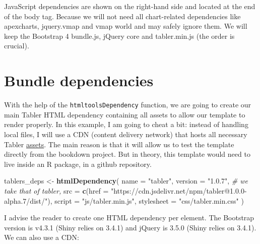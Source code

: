 \documentclass[
]{book}
\newenvironment{Shaded}{\begin{snugshade}}{\end{snugshade}}
\newcommand{\CommentTok}[1]{\textcolor[rgb]{0.56,0.35,0.01}{\textit{#1}}}
\newcommand{\DataTypeTok}[1]{\textcolor[rgb]{0.13,0.29,0.53}{#1}}
\newcommand{\KeywordTok}[1]{\textcolor[rgb]{0.13,0.29,0.53}{\textbf{#1}}}
\newcommand{\NormalTok}[1]{#1}
\newcommand{\StringTok}[1]{\textcolor[rgb]{0.31,0.60,0.02}{#1}}
\begin{document}
JavaScript dependencies are shown on the right-hand side and located at the end of the body tag. Because we will not need all chart-related dependencies like apexcharts, jquery.vmap and vmap world and may safely ignore them. We will keep the Bootstrap 4 bundle.js, jQuery core and tabler.min.js (the order is crucial).

\hypertarget{bundle-dependencies}{%
\section{Bundle dependencies}\label{bundle-dependencies}}

With the help of the \texttt{htmltoolsDependency} function, we are going to create our main Tabler HTML dependency containing all assets to allow our template to render properly. In this example, I am going to cheat a bit: instead of handling local files, I will use a CDN (content delivery network) that hosts all necessary Tabler \href{https://www.jsdelivr.com/package/npm/tabler}{assets}. The main reason is that it will allow us to test the template directly from the bookdown project. But in theory, this template would need to live inside an R package, in a github repository.

\begin{Shaded}
\begin{Highlighting}[]
\NormalTok{tablers_deps <-}\StringTok{ }\KeywordTok{htmlDependency}\NormalTok{(}
  \DataTypeTok{name =} \StringTok{"tabler"}\NormalTok{,}
  \DataTypeTok{version =} \StringTok{"1.0.7"}\NormalTok{, }\CommentTok{# we take that of tabler,}
  \DataTypeTok{src =} \KeywordTok{c}\NormalTok{(}\DataTypeTok{href =} \StringTok{"https://cdn.jsdelivr.net/npm/tabler@1.0.0-alpha.7/dist/"}\NormalTok{),}
  \DataTypeTok{script =} \StringTok{"js/tabler.min.js"}\NormalTok{,}
  \DataTypeTok{stylesheet =} \StringTok{"css/tabler.min.css"}
\NormalTok{)}
\end{Highlighting}
\end{Shaded}

I advise the reader to create one HTML dependency per element. The Bootstrap version is v4.3.1 (Shiny relies on 3.4.1) and jQuery is 3.5.0 (Shiny relies on 3.4.1). We can also use a CDN:
\end{document}
